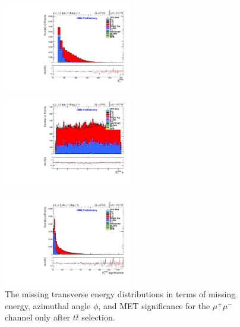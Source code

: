 \begin{figure}
\includegraphics[width=0.5\textwidth]{Plots/ControlPlots/TTbarDiLeptonAnalysis/MuMu/MET/patType1CorrectedPFMet/MET_splitTTbar_ratio.pdf}
\includegraphics[width=0.5\textwidth]{Plots/ControlPlots/TTbarDiLeptonAnalysis/MuMu/MET/patType1CorrectedPFMet/MET_phi_splitTTbar_ratio.pdf}\\
\begin{center}
\includegraphics[width=0.5\textwidth]{Plots/ControlPlots/TTbarDiLeptonAnalysis/EE/MET/patType1CorrectedPFMet/METsignificance_splitTTbar_ratio.pdf}
\end{center}
\caption{The missing transverse energy distributions in terms of missing energy, azimuthal angle $\phi$, and MET significance for the $\mu^{+}\mu^{-}$ channel only after $t\bar{t}$ selection.}
\label{fig-METphiSig}
\end{figure}

